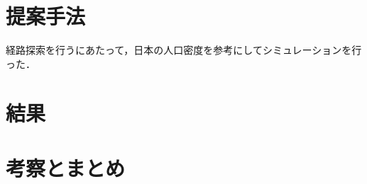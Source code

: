 \documentclass[a4paper, 11pt]{ltjsarticle}
\begin{document}
\clearpage
\section{提案手法}
経路探索を行うにあたって，日本の人口密度を参考にしてシミュレーションを行った．

\clearpage
\section{結果}

\clearpage
\section{考察とまとめ}

\clearpage
{}


\end{document}
